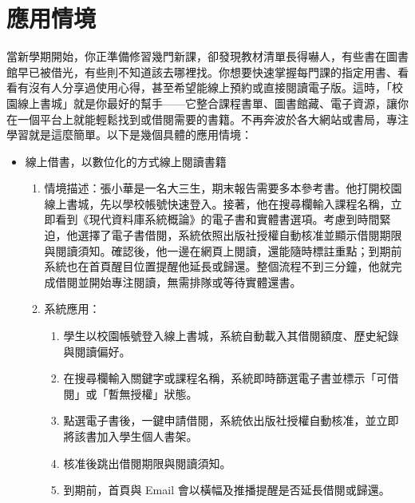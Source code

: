 \chapter{應用情境}

\hspace{2em}當新學期開始，你正準備修習幾門新課，卻發現教材清單長得嚇人，有些書在圖書館早已被借光，有些則不知道該去哪裡找。你想要快速掌握每門課的指定用書、看看有沒有人分享過使用心得，甚至希望能線上預約或直接閱讀電子版。這時，「校園線上書城」就是你最好的幫手——它整合課程書單、圖書館藏、電子資源，讓你在一個平台上就能輕鬆找到或借閱需要的書籍。不再奔波於各大網站或書局，專注學習就是這麼簡單。以下是幾個具體的應用情境：

\begin{itemize}
    \item 線上借書，以數位化的方式線上閱讀書籍
        \begin{enumerate}
            \item 情境描述：張小華是一名大三生，期末報告需要多本參考書。他打開校園線上書城，先以學校帳號快速登入。接著，他在搜尋欄輸入課程名稱，立即看到《現代資料庫系統概論》的電子書和實體書選項。考慮到時間緊迫，他選擇了電子書借閱，系統依照出版社授權自動核准並顯示借閱期限與閱讀須知。確認後，他一邊在網頁上閱讀，還能隨時標註重點；到期前系統也在首頁醒目位置提醒他延長或歸還。整個流程不到三分鐘，他就完成借閱並開始專注閱讀，無需排隊或等待實體還書。
            \item 系統應用：
                \begin{enumerate}
                    \item 學生以校園帳號登入線上書城，系統自動載入其借閱額度、歷史紀錄與閱讀偏好。
                    \item 在搜尋欄輸入關鍵字或課程名稱，系統即時篩選電子書並標示「可借閱」或「暫無授權」狀態。
                    \item 點選電子書後，一鍵申請借閱，系統依出版社授權自動核准，並立即將該書加入學生個人書架。
                    \item 核准後跳出借閱期限與閱讀須知。
                    \item 到期前，首頁與 Email 會以橫幅及推播提醒是否延長借閱或歸還。
                \end{enumerate}
        \end{enumerate}
        

\end{itemize}
